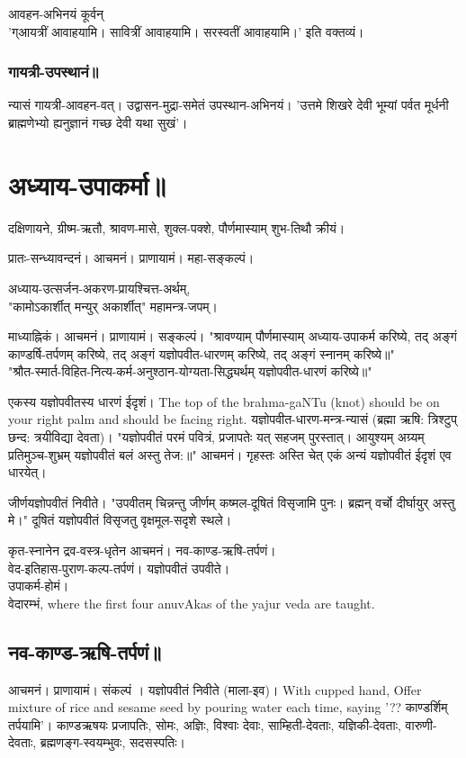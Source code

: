\documentclass[oneside, article]{memoir}
\begin{document}
आवहन-अभिनयं कूर्वन् \\
'ग्आयत्रीं आवाहयामि। सावित्रीं आवाहयामि। सरस्वतीं आवाहयामि।' इति वक्तव्यं।

\subsection{गायत्री-उपस्थानं॥}
न्यासं गायत्री-आवहन-वत्। उद्वासन-मुद्रा-समेतं उपस्थान-अभिनयं। 'उत्तमे शिखरे देवी भूम्यां पर्वत मूर्धनी
ब्राह्मणेभ्यो ह्यनुज्ञानं गच्छ देवी यथा सुखं'।

\chapter{अध्याय-उपाकर्मा॥}
दक्षिणायने, ग्रीष्म-ऋतौ, श्रावण-मासे, शुक्ल-पक्शे, पौर्णमास्याम् शुभ-तिथौ क्रीयं।

प्रातः-सन्ध्यावन्दनं। आचमनं। प्राणायामं। महा-सङ्कल्पं।

अध्याय-उत्सर्जन-अकरण-प्रायश्चित्त-अर्थम्, \\
"कामोऽकार्शीत् मन्युर् अकार्शीत्" महामन्त्र-जपम्।

माध्याह्निकं। आचमनं। प्राणायामं। सङ्कल्पं। "श्रावण्याम् पौर्णमास्याम् अध्याय-उपाकर्म करिष्ये, तद् अङ्गं काण्डर्षि-तर्पणम् करिष्ये, तद् अङ्गं यज्ञोपवीत-धारणम् करिष्ये, तद् अङ्गं स्नानम् करिष्ये॥" \\
"श्रौत-स्मार्त-विहित-नित्य-कर्म-अनुश्ठान-योग्यता-सिद्ध्यर्थम् यज्ञोपवीत-धारणं करिष्ये॥"

एकस्य यज्ञोपवीतस्य धारणं ईदृशं। The top of the brahma-gaNTu (knot) should be on your right palm and should be facing right. यज्ञोपवीत-धारण-मन्त्र-न्यासं (ब्रह्मा ऋषि: त्रिश्टुप् छन्द: त्रयीविद्या देवता)।   "यज्ञोपवीतं परमं पवित्रं, प्रजापतेः यत् सहजम् पुरस्तात्। आयुश्यम् अग्र्यम् प्रतिमुञ्च-शुभ्रम् यज्ञोपवीतं बलं अस्तु तेज:॥" आचमनं। गृहस्तः अस्ति चेत् एकं अन्यं यज्ञोपवीतं ईदृशं एव धारयेत्।

जीर्णयज्ञोपवीतं निवीते। "उपवीतम् चिन्नन्तु जीर्णम् कष्मल-दूषितं विसृजामि पुनः। ब्रह्मन् वर्चो दीर्घायुर् अस्तु मे।" दूषितं यज्ञोपवीतं विसृजतु वृक्षमूल-सदृशे स्थले।

कृत-स्नानेन द्रव-वस्त्र-धृतेन आचमनं। नव-काण्ड-ऋषि-तर्पणं। \\वेद-इतिहास-पुराण-कल्प-तर्पणं। यज्ञोपवीतं उपवीते।\\ उपाकर्म-होमं। \\ वेदारम्भं, where the first four anuvAkas of the yajur veda are taught.

\section{नव-काण्ड-ऋषि-तर्पणं॥}
आचमनं। प्राणायामं। संकल्पं । यज्ञोपवीतं निवीते (माला-इव)। With cupped hand, Offer mixture of rice and sesame seed by pouring water each time, saying '??  काण्डर्शिम् तर्पयामि'। काण्डऋषयः प्रजापतिः, सोमः, अज्ञिः, विश्वाः देवाः, साम्हिती-देवताः, यज्ञिकी-देवताः, वारुणी-देवताः,  ब्रह्मणङ्ग-स्वयम्भुवः, सदसस्पतिः।
\end{document}
